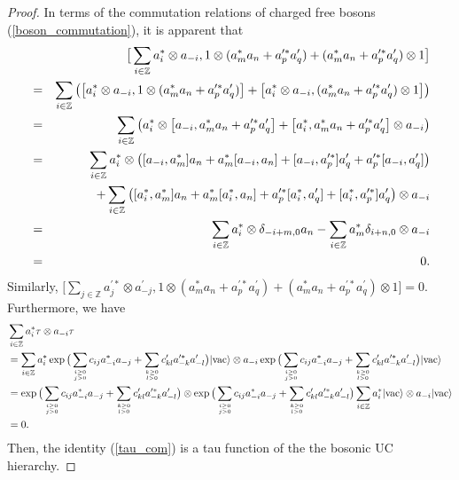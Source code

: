 \documentclass[10pt,a4paper]{amsart}
\numberwithin{equation}{section}
\begin{document}
\begin{proof}
In terms of the commutation relations of charged free bosons (\ref{boson_commutation}), it is apparent that
\begin{eqnarray}\label{solution_jiaohuan}
&&\big[\sum\limits_{i\in\mathbb{Z}}a^{\ast}_{i}\otimes a_{-i},1\otimes(a^{\ast}_{m}a_{n}+a^{\prime\ast}_{p}a^{\prime}_{q})
+(a^{\ast}_{m}a_{n}+a^{\prime\ast}_{p}a^{\prime}_{q})\otimes1\big]\notag\\
&=&\sum\limits_{i\in\mathbb{Z}}\left(\left[a^{\ast}_{i}\otimes a_{-i},1\otimes(a^{\ast}_{m}a_{n}+a^{\prime\ast}_{p}a^{\prime}_{q})\right]
+\left[a^{\ast}_{i}\otimes a_{-i},(a^{\ast}_{m}a_{n}+a^{\prime\ast}_{p}a^{\prime}_{q})\otimes1\right]\right)\notag\\
&=&\sum\limits_{i\in\mathbb{Z}}\left(a^{\ast}_{i}\otimes \left[a_{-i},a^{\ast}_{m}a_{n}+a^{\prime\ast}_{p}a^{\prime}_{q}\right]+
\left[a^{\ast}_{i},a^{\ast}_{m}a_{n}+a^{\prime\ast}_{p}a^{\prime}_{q}\right]\otimes a_{-i}\right)\notag\\
&=&\sum\limits_{i\in\mathbb{Z}}a^{\ast}_{i}\otimes\left([a_{-i},a^{\ast}_{m}]a_{n}+
a^{\ast}_{m}[a_{-i},a_{n}]+[a_{-i},a^{\prime\ast}_{p}]a^{\prime}_{q}+
a^{\prime\ast}_{p}[a_{-i},a^{\prime}_{q}]\right)\notag\\
&&+\sum\limits_{i\in\mathbb{Z}}\left([a^{\ast}_{i},a^{\ast}_{m}]a_{n}
+a^{\ast}_{m}[a^{\ast}_{i},a_{n}]+a^{\prime\ast}_{p}[a^{\ast}_{i},a^{\prime}_{q}]
+[a^{\ast}_{i},a^{\prime\ast}_{p}]a^{\prime}_{q}\right)\otimes a_{-i}\notag\\
&=&\sum\limits_{i\in\mathbb{Z}}a^{\ast}_{i}\otimes \delta_{-i+m,0}a_{n}-\sum\limits_{i\in\mathbb{Z}}a^{\ast}_{m}\delta_{i+n,0}\otimes a_{-i}\notag\\
&=&0.
\end{eqnarray}
Similarly, $\big[\sum\limits_{j\in\mathbb{Z}}a^{\prime\ast}_{j}\otimes a^{\prime}_{-j},1\otimes(a^{\ast}_{m}a_{n}+a^{\prime\ast}_{p}a^{\prime}_{q})
+(a^{\ast}_{m}a_{n}+a^{\prime\ast}_{p}a^{\prime}_{q})\otimes1\big]=0$.
Furthermore, we have
\begin{align}
&\sum\limits_{i\in\mathbb{Z}}a^{\ast}_{i}\tau\otimes a_{-i}\tau\notag\\
&=
\sum\limits_{i\in\mathbb{Z}}a^{\ast}_{i}\exp\big(\sum\limits_{i\geq0\atop{j>0}}c_{ij}a^{\ast}_{-i}a_{-j}+
\sum\limits_{k\geq0\atop{l>0}}c^{\prime}_{kl}a^{\prime\ast}_{-k}a^{\prime}_{-l}\big)
|\text{vac}\rangle\otimes a_{-i}\exp\big(\sum\limits_{i\geq0\atop{j>0}}c_{ij}a^{\ast}_{-i}a_{-j}+
\sum\limits_{k\geq0\atop{l>0}}c^{\prime}_{kl}a^{\prime\ast}_{-k}a^{\prime}_{-l}\big)
|\text{vac}\rangle\notag\\
&=\exp\big(\sum\limits_{i\geq0\atop{j>0}}c_{ij}a^{\ast}_{-i}a_{-j}+
\sum\limits_{k\geq0\atop{l>0}}c^{\prime}_{kl}a^{\prime\ast}_{-k}a^{\prime}_{-l}\big)
\otimes\exp\big(\sum\limits_{i\geq0\atop{j>0}}c_{ij}a^{\ast}_{-i}a_{-j}+
\sum\limits_{k\geq0\atop{l>0}}c^{\prime}_{kl}a^{\prime\ast}_{-k}a^{\prime}_{-l}\big)
\sum\limits_{i\in\mathbb{Z}}a^{\ast}_{i}|\text{vac}\rangle\otimes a_{-i}|\text{vac}\rangle\notag\\
&=0.
\end{align}
Then, the identity (\ref{tau_com}) is a tau function of the the bosonic UC hierarchy.
\end{proof}
\end{document}
